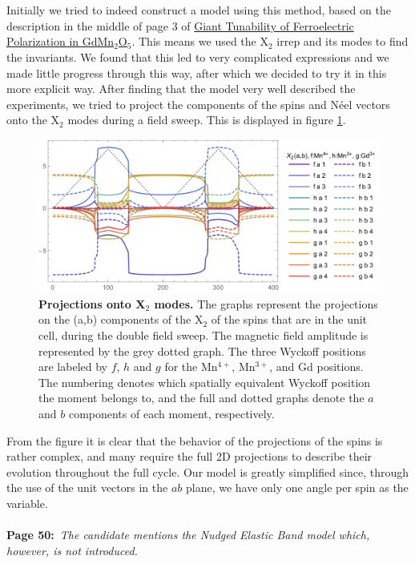 \documentclass[a4, UTF8]{article}
\begin{document}
\\\\
Initially we tried to indeed construct a model using this method, based on the description in the middle of page 3 of \href{https://link.aps.org/doi/10.1103/PhysRevLett.110.137203}{Giant Tunability of Ferroelectric Polarization in GdMn$_2$O$_5$}. This means we used the X$_2$ irrep and its modes to find the invariants. We found that this led to very complicated expressions and we made little progress through this way, after which we decided to try it in this more explicit way.
After finding that the model very well described the experiments, we tried to project the components of the spins and N\'eel vectors onto the X$_2$ modes during a field sweep. This is displayed in figure \ref{allirreps}.
\begin{figure}[h]
	\includegraphics[width=\textwidth]{allIrreps.pdf}
	\caption{\label{allirreps}{\bf Projections onto X$_2$ modes.} The graphs represent the projections on the (a,b) components of the X$_2$ of the spins that are in the unit cell, during the double field sweep. The magnetic field amplitude is represented by the grey dotted graph. The three Wyckoff positions are labeled by $f$, $h$ and $g$ for the Mn$^{4+}$, Mn$^{3+}$, and Gd positions. The numbering denotes which spatially equivalent Wyckoff position the moment belongs to, and the full and dotted graphs denote the $a$ and $b$ components of each moment, respectively.}
\end{figure}
From the figure it is clear that the behavior of the projections of the spins is rather complex, and many require the full 2D projections to describe their evolution throughout the full cycle.
Our model is greatly simplified since, through the use of the unit vectors in the $ab$ plane, we have only one angle per spin as the variable.
\\\\
{\bf Page 50:}~{\it The candidate mentions the Nudged Elastic Band model which, however, is not introduced.}
\end{document}

